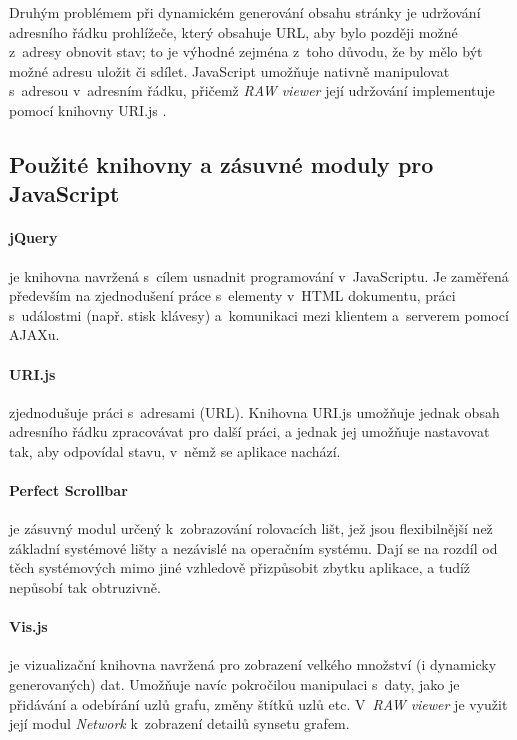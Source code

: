 \documentclass[a4paper, 11pt, oneside, showtrims]{book}
\newcommand{\simplywn}{\textit{RAW viewer} }
\begin{document}
					Druhým problémem při dynamickém generování obsahu stránky je udržování adresního řádku prohlížeče, který obsahuje URL, aby bylo později možné z~adresy obnovit stav; to je výhodné zejména z~toho důvodu, že by mělo být možné adresu uložit či sdílet. JavaScript umožňuje nativně manipulovat s~adresou v~adresním řádku, přičemž \simplywn její udržování implementuje pomocí knihovny URI.js \parencite{urijsWeb}.

				\subsection{Použité knihovny a zásuvné moduly pro JavaScript}

					\paragraph{jQuery} je knihovna navržená s~cílem usnadnit programování v~JavaScriptu. Je zaměřená především na zjednodušení práce s~elementy v~HTML dokumentu, práci s~událostmi (např. stisk klávesy) a~komunikaci mezi klientem a~serverem pomocí AJAXu. \parencite{jqueryWeb}

					\paragraph{URI.js} zjednodušuje práci s~adresami (URL). Knihovna URI.js umožňuje jednak obsah adresního řádku zpracovávat pro další práci, a jednak jej umožňuje nastavovat tak, aby odpovídal stavu, v~němž se aplikace nachází. \parencite{urijsWeb}

					\paragraph{Perfect Scrollbar} je zásuvný modul určený k~zobrazování rolovacích lišt, jež jsou flexibilnější než základní systémové lišty a nezávislé na operačním systému. Dají se na rozdíl od těch systémových mimo jiné vzhledově přizpůsobit zbytku aplikace, a tudíž nepůsobí tak obtruzivně. \parencite{perfectScrollbarGithub}

					\paragraph{Vis.js} je vizualizační knihovna navržená pro zobrazení velkého množství (i dynamicky generovaných) dat. Umožňuje navíc pokročilou manipulaci s~daty, jako je přidávání a odebírání uzlů grafu, změny štítků uzlů etc. V~\simplywn je využit její modul \textit{Network} k~zobrazení detailů synsetu grafem. \parencite{visjWeb}
\end{document}
